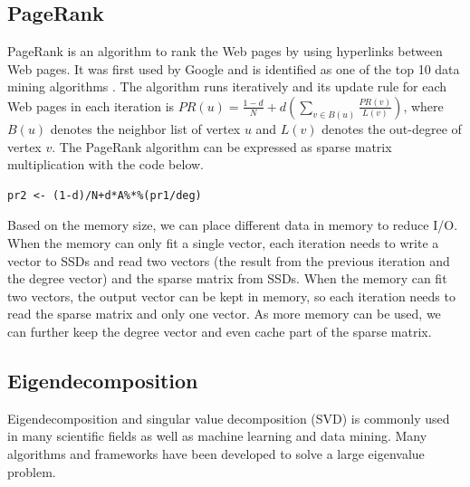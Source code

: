 \subsection{PageRank}
PageRank is an algorithm to rank the Web pages by using hyperlinks between Web
pages. It was first used by Google and is identified as one of the top 10 data
mining algorithms \cite{top10}. The algorithm runs iteratively and its update
rule for each Web pages in each iteration is
$PR(u) = \frac{1-d}{N} + d(\sum\limits_{v \in B(u)} \frac{PR(v)}{L(v)})$,
where $B(u)$ denotes the neighbor list of vertex $u$ and $L(v)$ denotes
the out-degree of vertex $v$. The PageRank algorithm can be expressed as sparse
matrix multiplication with the code below.

\vspace{-5pt}
\begin{verbatim}
pr2 <- (1-d)/N+d*A%*%(pr1/deg)
\end{verbatim}
\vspace{-5pt}

Based on the memory size, we can place different data in memory to reduce I/O.
When the memory can only fit a single vector, each iteration needs
to write a vector to SSDs and read two vectors (the result from
the previous iteration and the degree vector) and the sparse matrix
from SSDs.
When the memory can fit two vectors, the output vector can be kept
in memory, so each iteration needs to read the sparse matrix and only
one vector.
As more memory can be used, we can further keep the degree vector
and even cache part of the sparse matrix.

\subsection{Eigendecomposition}
Eigendecomposition and singular value decomposition (SVD) is commonly used
in many scientific fields as well as machine learning and data mining. Many
algorithms \cite{Lanczos, IRLM, krylovschur} and frameworks
\cite{arpack, anasazi, slepc} have been developed to solve a large eigenvalue
problem.

